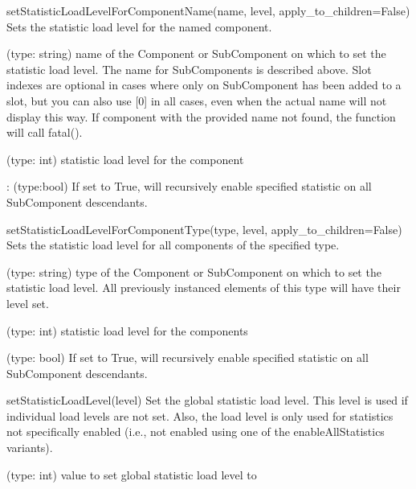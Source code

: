 \begin{functiondoc}{setStatisticLoadLevelForComponentName(name, level, apply_to_children=False)}{
    Sets the statistic load level for the named component.
  }

   (type: string) name of the Component or SubComponent on
  which to set the statistic load level.  The name for SubComponents
  is described above.  Slot indexes are optional in cases where only
  on SubComponent has been added to a slot, but you can also use [0]
  in all cases, even when the actual name will not display this
  way. If component with the provided name not found, the function
  will call fatal().

   (type: int) statistic load level for the component

  : (type:bool) If set to True, will
  recursively enable specified statistic on all SubComponent
  descendants.

  \noreturn
\end{functiondoc}


\begin{functiondoc}{setStatisticLoadLevelForComponentType(type, level, apply_to_children=False)}{
    Sets the statistic load level for all components of the specified
    type.
  }

   (type: string) type of the Component or SubComponent on
  which to set the statistic load level.  All previously instanced
  elements of this type will have their level set.
  
   (type: int) statistic load level for the components

   (type: bool) If set to True, will
  recursively enable specified statistic on all SubComponent
  descendants.

  \noreturn
\end{functiondoc}


\begin{functiondoc}{setStatisticLoadLevel(level)}{
    Set the global statistic load level.  This level is used if
    individual load levels are not set.  Also, the load level is only
    used for statistics not specifically enabled (i.e., not enabled
    using one of the enableAllStatistics variants).
  }

   (type: int) value to set global statistic load level
  to

  \noreturn
\end{functiondoc}


